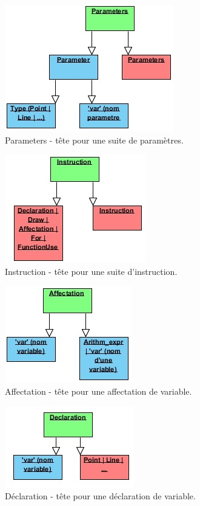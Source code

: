 \documentclass[11pt]{report} %
\begin{document}
\begin{figure}[h]
    \centering
    \includegraphics[scale=1]{img/parameters.jpg}
    \caption{\label{CG} Parameters - tête pour une suite de paramètres.}
\end{figure}
\begin{figure}[h]
    \centering
    \includegraphics[scale=1]{img/instruction.jpg}
    \caption{\label{CG} Instruction - tête pour une suite d'instruction.}
\end{figure}
\begin{figure}[h]
    \centering
    \includegraphics[scale=1]{img/affectation.jpg}
    \caption{\label{CG} Affectation - tête pour une affectation de variable.}
\end{figure}
\begin{figure}[h]
    \centering
    \includegraphics[scale=1]{img/declaration.jpg}
    \caption{\label{CG} Déclaration - tête pour une déclaration de variable.}
\end{figure}
\end{document}
